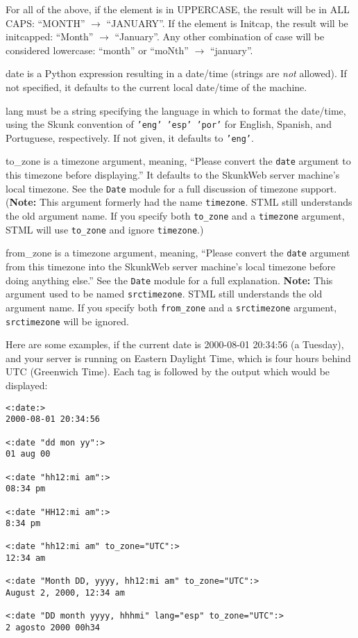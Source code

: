 \documentclass{manual}
\begin{document}
    For all of the above, if the element is in UPPERCASE, 
    the result will be in ALL CAPS: ``MONTH'' $\rightarrow$ ``JANUARY''. 
    If the element is Initcap, the result will be initcapped: 
    ``Month'' $\rightarrow$ ``January''. Any other combination of case will 
    be considered lowercase: ``month'' or ``moNth'' $\rightarrow$ ``january''.
    
\begin{argdesc}
\item[date] is a Python expression resulting in a
date/time (strings are \emph{not} allowed). 
If not specified, it defaults to the current local date/time of the machine.

\item[lang] must be a string specifying the language in which
to format the date/time, using the Skunk convention of \texttt{'eng'
'esp' 'por'} for English, Spanish, and Portuguese, respectively.
If not given, it defaults to \texttt{'eng'}.

\item[to_zone] is a timezone argument, meaning, ``Please convert
the \texttt{date} argument to this timezone before displaying.'' It defaults
to the SkunkWeb server machine's local timezone. See the \texttt{Date} module
for a full discussion of timezone support. (\textbf{Note:} This argument
formerly had the name \texttt{timezone}. STML still understands the old argument
name. If you specify both \texttt{to_zone} and a \texttt{timezone} argument,
STML will use \texttt{to_zone} and ignore \texttt{timezone}.)

\item[from_zone] is a timezone argument, meaning, ``Please convert
the \texttt{date} argument from this timezone into the SkunkWeb server
machine's local timezone before doing anything else.'' See the
\texttt{Date} module for a full explanation. \textbf{Note:} This argument
used to be named \texttt{srctimezone}. STML still understands the old
argument name. If you specify both \texttt{from_zone} and a
\texttt{srctimezone} argument, \texttt{srctimezone} will be ignored.
\end{argdesc}

Here are some examples, if the current date is 2000-08-01 20:34:56
(a Tuesday), and your server is running on Eastern Daylight Time, which
is four hours behind UTC (Greenwich Time). Each tag is followed by
the output which would be displayed:

\begin{verbatim}
<:date:> 
2000-08-01 20:34:56

<:date "dd mon yy":>
01 aug 00

<:date "hh12:mi am":>  
08:34 pm

<:date "HH12:mi am":>  
8:34 pm

<:date "hh12:mi am" to_zone="UTC":>  
12:34 am

<:date "Month DD, yyyy, hh12:mi am" to_zone="UTC":>  
August 2, 2000, 12:34 am

<:date "DD month yyyy, hhhmi" lang="esp" to_zone="UTC":>  
2 agosto 2000 00h34
\end{verbatim}
\end{document}
